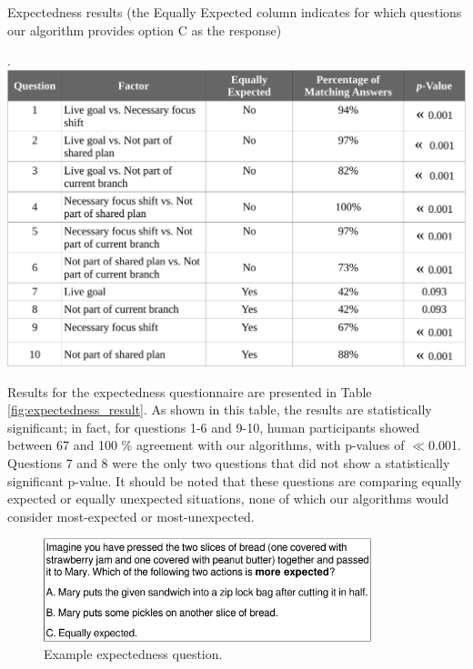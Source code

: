 \documentclass[12pt]{report}
\begin{document}
\vspace*{3mm}
\begin{table}[tbh]
  \centering
  \caption{Expectedness results (the Equally Expected column indicates
  for which questions our algorithm provides option C as the response)}.
  \label{fig:expectedness_result}
  \vspace*{-3mm}
  \includegraphics[width=1\textwidth]{figure/expectedness_result_croped.pdf}
\end{table}

Results for the expectedness questionnaire are presented in Table
\ref{fig:expectedness_result}. As shown in this table, the results are
statistically significant; in fact, for questions 1-6 and 9-10, human
participants showed between 67 and 100 \% agreement with our algorithms, with
p-values of $\ll$0.001. Questions 7 and 8 were the only two questions that did
not show a statistically significant p-value. It should be noted that these
questions are comparing equally expected or equally unexpected situations, none
of which our algorithms would consider most-expected or most-unexpected.


\begin{figure}[b]
  \centering
  \includegraphics[width=0.85\textwidth]{figure/question-sample-croped.pdf}
  \caption{{Example expectedness question.}}
  \label{fig:qs1}
\end{figure}
\end{document}
